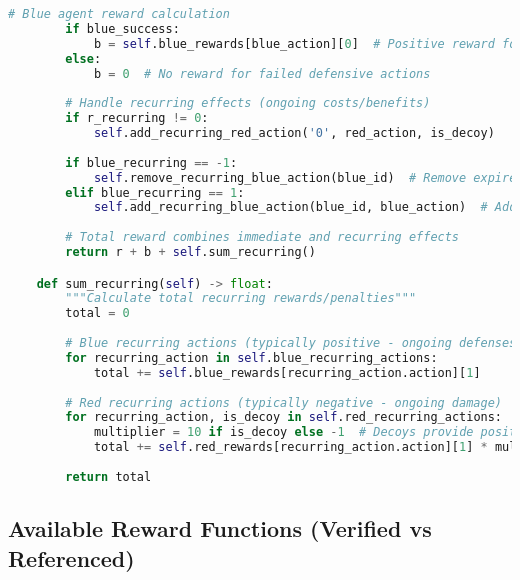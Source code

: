 \documentclass[12pt,a4paper]{article}
\begin{document}
\begin{lstlisting}[language=Python, caption=RL Reward Implementation]
        # Blue agent reward calculation
        if blue_success:
            b = self.blue_rewards[blue_action][0]  # Positive reward for successful defense
        else:
            b = 0  # No reward for failed defensive actions
        
        # Handle recurring effects (ongoing costs/benefits)
        if r_recurring != 0:
            self.add_recurring_red_action('0', red_action, is_decoy)
        
        if blue_recurring == -1:
            self.remove_recurring_blue_action(blue_id)  # Remove expired effect
        elif blue_recurring == 1:
            self.add_recurring_blue_action(blue_id, blue_action)  # Add ongoing effect
        
        # Total reward combines immediate and recurring effects
        return r + b + self.sum_recurring()

    def sum_recurring(self) -> float:
        """Calculate total recurring rewards/penalties"""
        total = 0
        
        # Blue recurring actions (typically positive - ongoing defenses)
        for recurring_action in self.blue_recurring_actions:
            total += self.blue_rewards[recurring_action.action][1]
        
        # Red recurring actions (typically negative - ongoing damage)
        for recurring_action, is_decoy in self.red_recurring_actions:
            multiplier = 10 if is_decoy else -1  # Decoys provide positive recurring reward
            total += self.red_rewards[recurring_action.action][1] * multiplier
        
        return total
\end{lstlisting}

\subsection{Available Reward Functions (Verified vs Referenced)}
\end{document}
